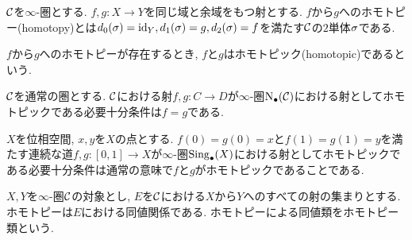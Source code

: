 \documentclass[uplatex, a4paper, 14Q, dvipdfmx]{jsreport}
\begin{document}
\begin{definition}
  $\mathcal{C}$を$\infty$-圏とする. 
  $f,g: X \to Y$を同じ域と余域をもつ射とする. 
  $f$から$g$へのホモトピー(homotopy)とは$d_0(\sigma)=\mathrm{id}_Y, d_1(\sigma)=g, d_2(\sigma)=f$を満たす$\mathcal{C}$の$2$単体$\sigma$である. 
  \begin{center}
  \end{center}
  $f$から$g$へのホモトピーが存在するとき, $f$と$g$はホモトピック(homotopic)であるという. 
\end{definition}

\begin{example}
  $\mathcal{C}$を通常の圏とする. 
  $\mathcal{C}$における射$f,g: C \to D$が$\infty$-圏$\mathrm{N}_{\bullet}(\mathcal{C})$における射としてホモトピックである必要十分条件は$f=g$である. 
\end{example}

\begin{example}
  $X$を位相空間, $x,y$を$X$の点とする. 
  $f(0)=g(0)=x$と$f(1)=g(1)=y$を満たす連続な道$f,g: [0,1] \to X$が$\infty$-圏$\mathrm{Sing}_\bullet(X)$における射としてホモトピックである必要十分条件は通常の意味で$f$と$g$がホモトピックであることである. 
\end{example}

\begin{exe}
  
\end{exe}

\begin{prop}
  $X,Y$を$\infty$-圏$\mathcal{C}$の対象とし, $E$を$\mathcal{C}$における$X$から$Y$へのすべての射の集まりとする.
  ホモトピーは$E$における同値関係である. 
  ホモトピーによる同値類をホモトピー類という. 
\end{prop}
\end{document}
